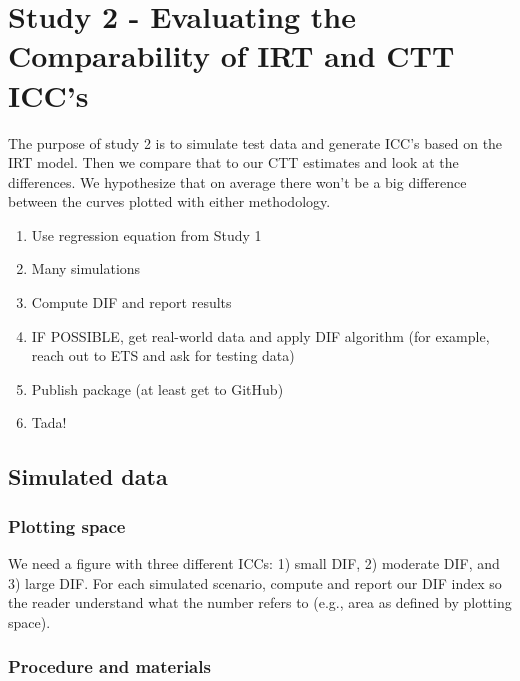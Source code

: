 \documentclass[
  man]{apa6}
\providecommand{\tightlist}{%
  \setlength{\itemsep}{0pt}\setlength{\parskip}{0pt}}
\begin{document}
\hypertarget{study-2---evaluating-the-comparability-of-irt-and-ctt-iccs}{%
\section{Study 2 - Evaluating the Comparability of IRT and CTT ICC's}\label{study-2---evaluating-the-comparability-of-irt-and-ctt-iccs}}

The purpose of study 2 is to simulate test data and generate ICC's based on the IRT model. Then we compare that to our CTT estimates and look at the differences. We hypothesize that on average there won't be a big difference between the curves plotted with either methodology.

\begin{enumerate}
\def\labelenumi{\arabic{enumi}.}
\tightlist
\item
  Use regression equation from Study 1
\item
  Many simulations
\item
  Compute DIF and report results
\item
  IF POSSIBLE, get real-world data and apply DIF algorithm (for example, reach out to ETS and ask for testing data)
\item
  Publish package (at least get to GitHub)
\item
  Tada!
\end{enumerate}

\hypertarget{simulated-data}{%
\subsection{Simulated data}\label{simulated-data}}

\hypertarget{plotting-space}{%
\subsubsection{Plotting space}\label{plotting-space}}

We need a figure with three different ICCs: 1) small DIF, 2) moderate DIF, and 3) large DIF. For each simulated scenario, compute and report our DIF index so the reader understand what the number refers to (e.g., area as defined by plotting space).

\hypertarget{procedure-and-materials}{%
\subsubsection{Procedure and materials}\label{procedure-and-materials}}
\end{document}
